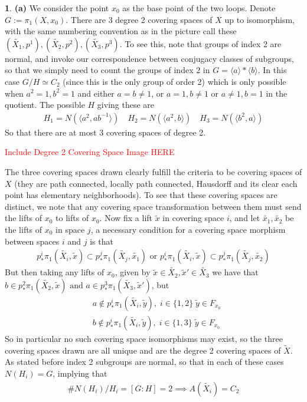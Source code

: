 \documentclass[10.5pt]{article}
\theoremstyle{definition}
\newtheorem{pb}{}
\newcommand{\set}[1]{\{#1\}}
\newcommand{\gen}[1]{\langle #1 \rangle}
\newcommand{\tand}{\text{ and }}
\newcommand{\tor}{\text{ or }}
\begin{document}
    \begin{pb}
        \textbf{(a)} We consider the point \(x_0\) as the base point of the two loops. 
        Denote \(G := \pi_1(X,x_0)\). There are 3 degree 2 covering spaces of \(X\) up to isomorphism, with the same numbering convention as in the picture call these \((\tilde{X_1},p^1),(\tilde{X_2},p^2),(\tilde{X_3},p^3)\). To see this, note that groups of index 2 are normal, and invoke our correspondence between conjugacy classes of subgroups, so that we simply need to count the groups of index \(2\) in \(G = \gen{a}*\gen{b}\). In this case \(G/H \simeq C_2\) (since this is the only group of order 2) which is only possible when \(a^2 = 1, b^2 = 1\) and either \(a = b \neq 1\), or \(a = 1, b \neq 1\) or \(a \neq 1, b = 1\) in the quotient. The possible \(H\) giving these are
        \begin{align*}
            H_1 = N(\gen{a^2,ab^{-1}}) \quad H_2 = N(\gen{a^2,b}) \quad H_3 = N(\gen{b^2,a})
        \end{align*}
        So that there are at most 3 covering spaces of degree 2. 
        
        \textcolor{red}{Include Degree 2 Covering Space Image HERE}
        
        The three covering spaces drawn clearly fulfill the criteria to be covering spaces of \(X\) (they are path connected, locally path connected, Hausdorff and its clear each point has elementary neighborhoods). To see that these covering spaces are distinct, we note that any covering space transformation between them must send the lifts of \(x_0\) to lifts of \(x_0\). Now fix a lift \(\tilde{x}\) in covering space \(i\), and let \(\tilde{x_1}, \tilde{x_2}\) be the lifts of \(x_0\) in space \(j\), a necessary condition for a covering space morphism between spaces \(i\) and \(j\) is that
        \begin{align*}
            p^i_*\pi_1(\tilde{X_i},\tilde{x}) \subset p^j_*\pi_1(\tilde{X_j},\tilde{x_1}) \tor p^i_*\pi_1(\tilde{X_i},\tilde{x}) \subset p^j_*\pi_1(\tilde{X_j},\tilde{x_2})
        \end{align*}
        But then taking any lifts of \(x_0\), given by \(\tilde{x} \in \tilde{X_2}, \tilde{x}' \in \tilde{X_3}\) we have that \(b \in p^2_*\pi_1(\tilde{X_2},\tilde{x}) \tand a \in p^3_*\pi_1(\tilde{X_3},\tilde{x}')\), but
        \begin{align*}
            &a \not \in p^i_*\pi_1(\tilde{X_i},\tilde{y}), \; i \in \set{1,2} \; \tilde{y} \in F_{x_0} \\
            &b \not \in p^i_*\pi_1(\tilde{X_i},\tilde{y}), \; i \in \set{1,3} \; \tilde{y} \in F_{x_0}
        \end{align*}
        So in particular no such covering space isomorphisms may exist, so the three covering spaces drawn are all unique and are the degree 2 covering spaces of \(\tilde{X}\). As stated before index 2 subgroups are normal, so that in each of these cases \(N(H_i) = G\), implying that
        \begin{align*}
            \# N(H_i)/H_i = [G:H] = 2 \implies A(\tilde{X_i}) = C_2
        \end{align*}


\end{pb}
\end{document}

